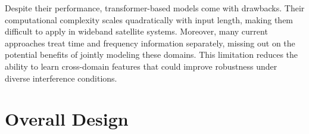 \documentclass[conference]{IEEEtran}
\begin{document}
Despite their performance, transformer-based models come with drawbacks. Their computational complexity scales quadratically with input length, making them difficult to apply in wideband satellite systems. Moreover, many current approaches treat time and frequency information separately, missing out on the potential benefits of jointly modeling these domains. This limitation reduces the ability to learn cross-domain features that could improve robustness under diverse interference conditions.

\section{Overall Design}
\label{sec:model}




\end{document}
